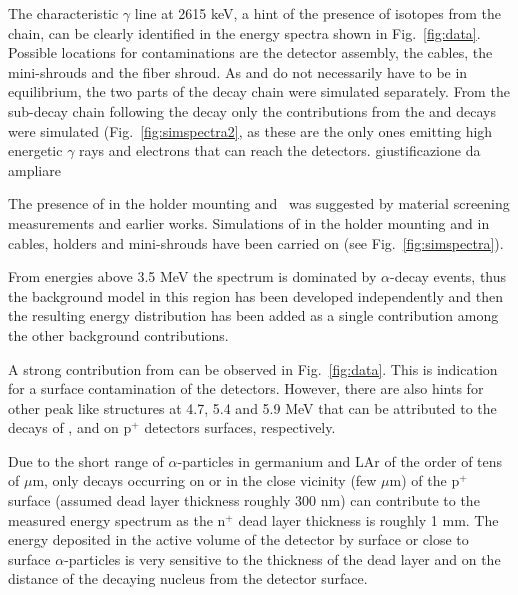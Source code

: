  The characteristic $\gamma$ line at 2615 keV, a hint of the presence of isotopes from the  chain, can be clearly identified in the energy spectra shown in Fig.~\ref{fig:data}. Possible locations for contaminations are the detector assembly, the cables, the mini-shrouds and the fiber shroud. As  and  do not necessarily have to be in equilibrium, the two parts of the decay chain were simulated separately. From the sub-decay chain following the  decay only the contributions from the  and  decays were simulated (Fig.~\ref{fig:simspectra2}, as these are the only ones emitting high energetic $\gamma$ rays and electrons that can reach the detectors. {\color{red}giustificazione da ampliare}

 The presence of  in the holder mounting and  was suggested by material screening measurements and earlier works. Simulations of  in the holder mounting and  in cables, holders and mini-shrouds have been carried on (see Fig.~\ref{fig:simspectra}).

 From energies above 3.5 MeV the spectrum is dominated by $\alpha$-decay events, thus the background model in this region has been developed independently and then the resulting energy distribution has been added as a single contribution among the other background contributions.

A strong contribution from  can be observed in Fig.~\ref{fig:data}. This is indication for a surface contamination of the detectors. However, there are also hints for other peak like structures at 4.7, 5.4 and 5.9 MeV that can be attributed to the decays of ,  and  on p$^+$ detectors surfaces, respectively.

Due to the short range of $\alpha$-particles in germanium and LAr of the order of tens of $\mu$m, only decays occurring on or in the close vicinity (few $\mu$m) of the p$^+$ surface (assumed dead layer thickness roughly 300 nm) can contribute to the measured energy spectrum as the n$^+$ dead layer thickness is roughly 1 mm. The energy deposited in the active volume of the detector by surface or close to surface $\alpha$-particles is very sensitive to the thickness of the dead layer and on the distance of the decaying nucleus from the detector surface.


